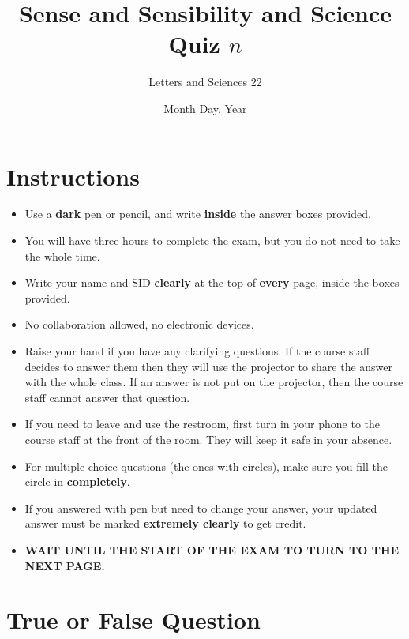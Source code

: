 \documentclass[letterpaper,11pt]{article}
\title{Sense and Sensibility and Science Quiz $n$}
\author{Letters and Sciences 22}
\date{Month Day, Year}
\begin{document}

\maketitle
\thispagestyle{fancy}

\section*{Instructions}

\begin{itemize}
    \item Use a \textbf{dark} pen or pencil, and write \textbf{inside} the answer boxes provided.
    \item You will have three hours to complete the exam, but you do not need to take the whole time.
    \item Write your name and SID \textbf{clearly} at the top of \textbf{every} page, inside the boxes provided.
    \item No collaboration allowed, no electronic devices.
    \item Raise your hand if you have any clarifying questions. If the course staff decides to answer them then they will use the projector to share the answer with the whole class. If an answer is not put on the projector, then the course staff cannot answer that question.
    \item If you need to leave and use the restroom, first turn in your phone to the course staff at the front of the room. They will keep it safe in your absence.
    \item For multiple choice questions (the ones with circles), make sure you fill the circle in \textbf{completely}.
    \item If you answered with pen but need to change your answer, your updated answer must be marked \textbf{extremely clearly} to get credit.
    \item \textbf{WAIT UNTIL THE START OF THE EXAM TO TURN TO THE NEXT PAGE.}
\end{itemize}

\newpage


\section{True or False Question}
\end{document}
